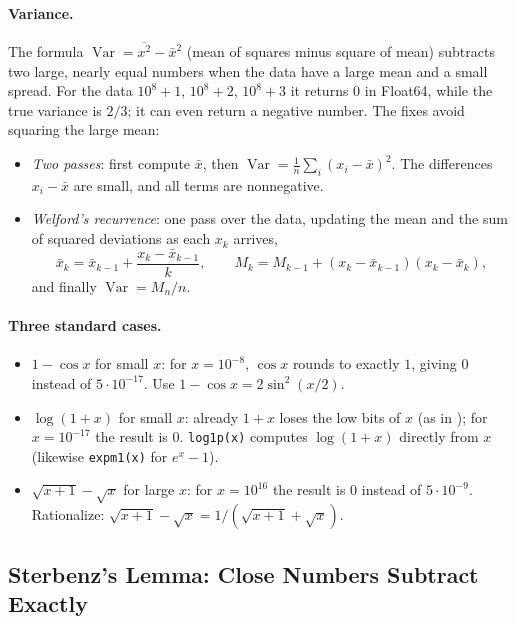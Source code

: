 \paragraph{Variance.} The formula $\operatorname{Var} = \overline{x^2} - \bar{x}^2$ (mean of squares minus square of mean) subtracts two large, nearly equal numbers when the data have a large mean and a small spread. For the data $10^8 + 1$, $10^8 + 2$, $10^8 + 3$ it returns $0$ in Float64, while the true variance is $2/3$; it can even return a negative number. The fixes avoid squaring the large mean:
\begin{itemize}
  \item \emph{Two passes}: first compute $\bar{x}$, then $\operatorname{Var} = \frac1n\sum_i (x_i - \bar{x})^2$. The differences $x_i - \bar{x}$ are small, and all terms are nonnegative.
  \item \emph{Welford's recurrence}: one pass over the data, updating the mean and the sum of squared deviations as each $x_k$ arrives,
  \begin{equation}
    \bar{x}_k = \bar{x}_{k-1} + \frac{x_k - \bar{x}_{k-1}}{k}, \qquad M_k = M_{k-1} + (x_k - \bar{x}_{k-1})(x_k - \bar{x}_k),
  \end{equation}
  and finally $\operatorname{Var} = M_n/n$.
\end{itemize}

\paragraph{Three standard cases.}
\begin{itemize}
  \item $1 - \cos x$ for small $x$: for $x = 10^{-8}$, $\cos x$ rounds to exactly $1$, giving $0$ instead of $5 \cdot 10^{-17}$. Use $1 - \cos x = 2\sin^2(x/2)$.
  \item $\log(1 + x)$ for small $x$: already $1 + x$ loses the low bits of $x$ (as in ); for $x = 10^{-17}$ the result is $0$. \texttt{log1p(x)} computes $\log(1 + x)$ directly from $x$ (likewise \texttt{expm1(x)} for $e^x - 1$).
  \item $\sqrt{x + 1} - \sqrt{x}$ for large $x$: for $x = 10^{16}$ the result is $0$ instead of $5 \cdot 10^{-9}$. Rationalize: $\sqrt{x + 1} - \sqrt{x} = 1/(\sqrt{x + 1} + \sqrt{x})$.
\end{itemize}

\subsection{Sterbenz's Lemma: Close Numbers Subtract Exactly}

